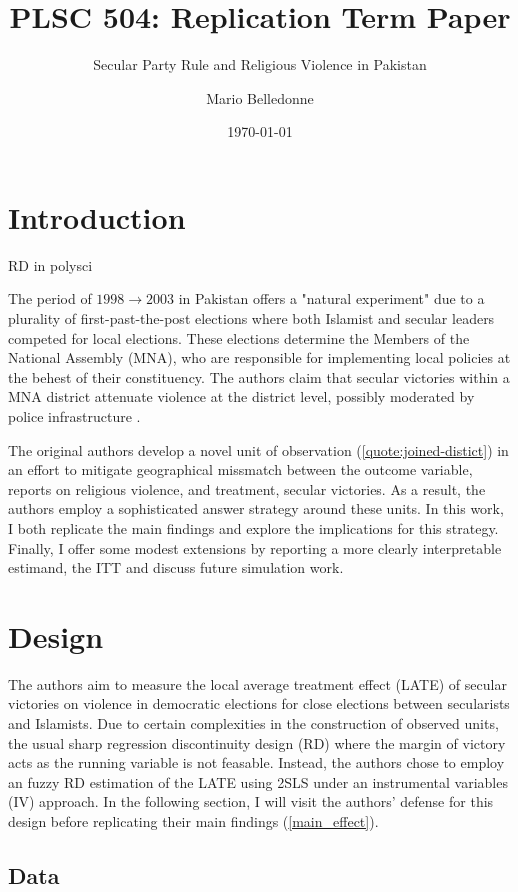 \documentclass{scrartcl}
\title{PLSC 504: Replication Term Paper}
\subtitle{Secular Party Rule and Religious Violence in Pakistan}
\author{Mario Belledonne}
\date{\today}
\begin{document}
\maketitle

\section{Introduction}


RD in polysci


The period of $1998 \rightarrow 2003$ in Pakistan offers a "natural experiment" due to a plurality of first-past-the-post elections where both Islamist and secular leaders competed for local elections.
These elections determine the Members of the National Assembly (MNA), who are responsible for implementing local policies at the behest of their constituency.
The authors claim that secular victories within a MNA district attenuate violence at the district level, possibly moderated by police infrastructure \cite{nellis_siddiqui_2018}. 

The original authors develop a novel unit of observation (\ref{quote:joined-distict}) in an effort to mitigate geographical missmatch between the outcome variable, reports on religious violence, and treatment, secular victories. 
As a result, the authors employ a sophisticated answer strategy around these units.
In this work, I both replicate the main findings and explore the implications for this strategy. Finally, I offer some modest extensions by reporting a more clearly interpretable estimand, the ITT and discuss future simulation work.

\section{Design} \label{design}


The authors aim to measure the local average treatment effect (LATE) of secular victories on violence in democratic elections for close elections between secularists and Islamists.
Due to certain complexities in the construction of observed units, the usual sharp regression discontinuity design (RD) where the margin of victory acts as the running variable is not feasable.
Instead, the authors chose to employ an fuzzy RD estimation of the LATE using 2SLS under an instrumental variables (IV) approach.
In the following section, I will visit the authors' defense for this design before replicating their main findings (\ref{main_effect}).

\subsection{Data} \label{data}
\end{document}
